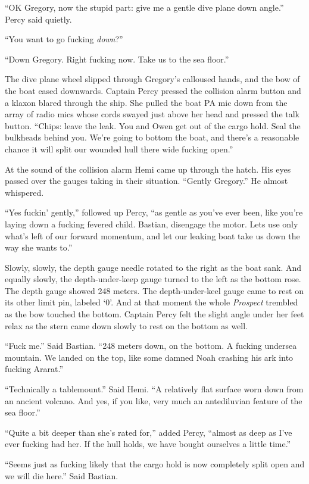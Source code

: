 \documentclass[
]{scrbook}
\begin{document}
``OK Gregory, now the stupid part: give me a gentle dive plane down
angle.'' Percy said quietly.

``You want to go fucking \emph{down}?''

``Down Gregory. Right fucking now. Take us to the sea floor.''

The dive plane wheel slipped through Gregory's calloused hands, and the
bow of the boat eased downwards. Captain Percy pressed the collision
alarm button and a klaxon blared through the ship. She pulled the boat
PA mic down from the array of radio mics whose cords swayed just above
her head and pressed the talk button. ``Chips: leave the leak. You and
Owen get out of the cargo hold. Seal the bulkheads behind you. We're
going to bottom the boat, and there's a reasonable chance it will split
our wounded hull there wide fucking open.''

At the sound of the collision alarm Hemi came up through the hatch. His
eyes passed over the gauges taking in their situation. ``Gently
Gregory.'' He almost whispered.

``Yes fuckin' gently,'' followed up Percy, ``as gentle as you've ever
been, like you're laying down a fucking fevered child. Bastian,
disengage the motor. Lets use only what's left of our forward momentum,
and let our leaking boat take us down the way she wants to.''

Slowly, slowly, the depth gauge needle rotated to the right as the boat
sank. And equally slowly, the depth-under-keep gauge turned to the left
as the bottom rose. The depth gauge showed 248 meters. The
depth-under-keel gauge came to rest on its other limit pin, labeled `0'.
And at that moment the whole \emph{Prospect} trembled as the bow touched
the bottom. Captain Percy felt the slight angle under her feet relax as
the stern came down slowly to rest on the bottom as well.

``Fuck me.'' Said Bastian. ``248 meters down, on the bottom. A fucking
undersea mountain. We landed on the top, like some damned Noah crashing
his ark into fucking Ararat.''

``Technically a tablemount.'' Said Hemi. ``A relatively flat surface
worn down from an ancient volcano. And yes, if you like, very much an
antediluvian feature of the sea floor.''

``Quite a bit deeper than she's rated for,'' added Percy, ``almost as
deep as I've ever fucking had her. If the hull holds, we have bought
ourselves a little time.''

``Seems just as fucking likely that the cargo hold is now completely
split open and we will die here.'' Said Bastian.
\end{document}
